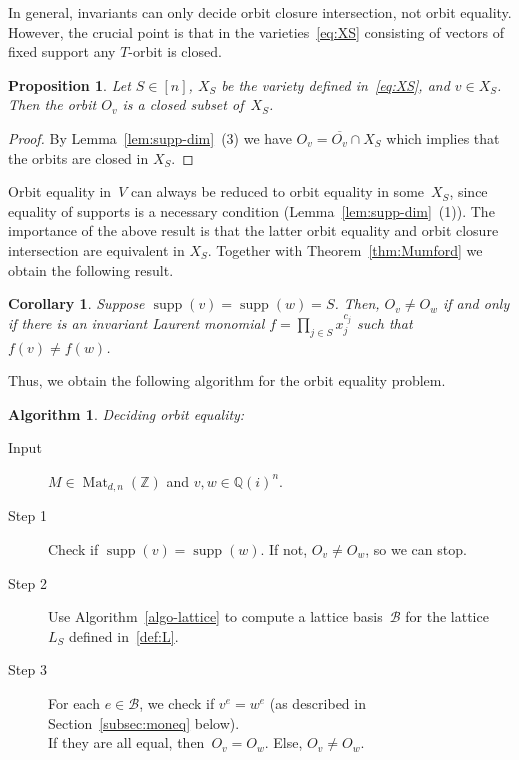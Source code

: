 \documentclass[10pt,a4paper]{article}
\DeclareMathOperator{\supp}{supp}
\DeclareMathOperator{\Mat}{Mat}
\newtheorem{corollary}[theorem]{Corollary}
\newtheorem{proposition}[theorem]{Proposition}
\theoremstyle{definition}
\newtheorem{algorithm}[theorem]{Algorithm}
\numberwithin{equation}{section}
\newcommand{\QQ}{\mathbb{Q}}
\newcommand{\ZZ}{\mathbb{Z}}
\begin{document}
In general, invariants can only decide orbit closure intersection, not orbit equality.
However, the crucial point is that in the varieties~\eqref{eq:XS} consisting of vectors of fixed support any $T$-orbit is closed.

\begin{proposition}\label{prop:X orbits closed}
Let $S \in [n]$, $X_S$ be the variety defined in~\eqref{eq:XS}, and $v \in X_S$.
Then the orbit $O_v$ is a closed subset of~$X_S$.
\end{proposition}
\begin{proof}
By Lemma~\ref{lem:supp-dim}~(3) we have $O_v=\overline{O_v}\cap X_S$ which implies that the orbits are closed in $X_S$.
\end{proof}

Orbit equality in~$V$ can always be reduced to orbit equality in some~$X_S$, since equality of supports is a necessary condition (Lemma~\ref{lem:supp-dim}~(1)).
The importance of the above result is that the latter orbit equality and orbit closure intersection are equivalent in $X_S$.
Together with Theorem~\ref{thm:Mumford} we obtain the following result.

\begin{corollary}\label{cor:orb sup}
Suppose $\supp(v) = \supp(w) = S$.
Then, $O_v \neq O_w$ if and only if there is an invariant Laurent monomial $f = \prod_{j \in S} x_j^{c_j}$ such that $f(v) \neq f(w)$.
\end{corollary}

Thus, we obtain the following algorithm for the orbit equality problem.

\begin{algorithm}\label{algo-oe} \emph{Deciding orbit equality:}
\begin{description}
\item [Input] $M \in \Mat_{d,n}(\ZZ)$ and $v,w \in \QQ(i)^n$.
\item [Step 1] Check if $\supp(v) = \supp(w)$. If not, $O_v \neq O_w$, so we can stop.
\item [Step 2] Use Algorithm~\ref{algo-lattice} to compute a lattice basis~$\mathcal B$ for the lattice~$L_S$ defined in~\eqref{def:L}.
\item [Step 3] For each $e \in \mathcal{B}$, we check if $v^e = w^e$ (as described in Section~\ref{subsec:moneq} below). \\
If they are all equal, then~$O_v = O_w$. Else, $O_v \neq O_w$.
\end{description}
\end{algorithm}
\end{document}
